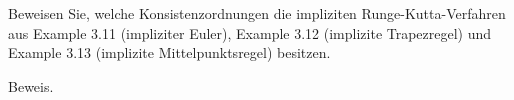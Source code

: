 \begin{exercise}
Beweisen Sie, welche Konsistenzordnungen die impliziten Runge-Kutta-Verfahren aus
Example 3.11 (impliziter Euler), Example 3.12 (implizite Trapezregel) und
Example 3.13 (implizite Mittelpunktsregel) besitzen.
\end{exercise}
\begin{solution}
Beweis.
\end{solution}
